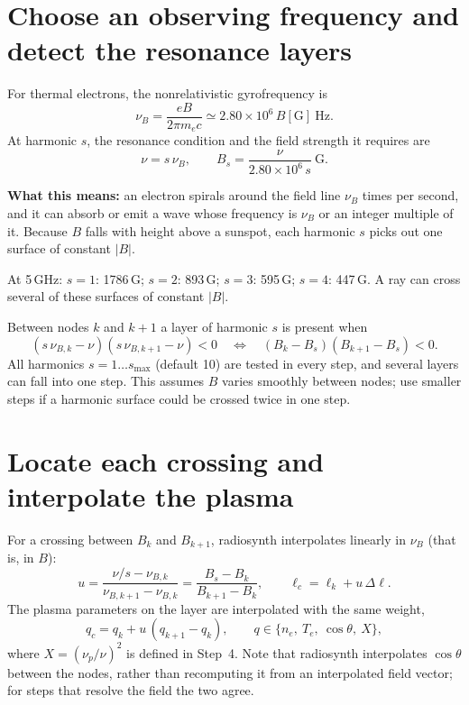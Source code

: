 \documentclass[11pt,a4paper]{article}
\newcommand{\nuB}{\nu_B}
\newcommand{\whatitmeans}[1]{\par{\color{head}\textbf{What this means:}} #1\par}
\begin{document}
\section{Choose an observing frequency and detect the resonance layers}
For thermal electrons, the nonrelativistic gyrofrequency is
\begin{equation}
  \nuB=\frac{eB}{2\pi m_ec}\simeq2.80\times10^6\,B[\text{G}]\ \text{Hz}.
\end{equation}
At harmonic $s$, the resonance condition and the field strength it requires are
\begin{equation}
  \nu=s\,\nuB,\qquad B_s=\frac{\nu}{2.80\times10^6\,s}\ \text{G}.
\end{equation}
\whatitmeans{an electron spirals around the field line $\nuB$ times per second, and it can absorb or emit a
wave whose frequency is $\nuB$ or an integer multiple of it. Because $B$ falls with height above a sunspot,
each harmonic $s$ picks out one surface of constant $|B|$.}
At 5\,GHz: $s=1$: 1786\,G; $s=2$: 893\,G; $s=3$: 595\,G; $s=4$: 447\,G. A ray can cross several
of these surfaces of constant $|B|$.

Between nodes $k$ and $k+1$ a layer of harmonic $s$ is present when
\begin{equation}
  (s\,\nu_{B,k}-\nu)(s\,\nu_{B,k+1}-\nu)<0
  \quad\Longleftrightarrow\quad (B_k-B_s)(B_{k+1}-B_s)<0 .
\end{equation}
All harmonics $s=1\ldots s_\text{max}$ (default 10) are tested in every step, and several layers can
fall into one step. This assumes $B$ varies smoothly between nodes; use smaller steps if a
harmonic surface could be crossed twice in one step.

\section{Locate each crossing and interpolate the plasma}
For a crossing between $B_k$ and $B_{k+1}$, radiosynth interpolates linearly in $\nuB$ (that is, in
$B$):
\begin{equation}
  u=\frac{\nu/s-\nu_{B,k}}{\nu_{B,k+1}-\nu_{B,k}}=\frac{B_s-B_k}{B_{k+1}-B_k},\qquad
  \ell_c=\ell_k+u\,\Delta\ell .
\end{equation}
The plasma parameters on the layer are interpolated with the same weight,
\begin{equation}
  q_c=q_k+u\,(q_{k+1}-q_k),\qquad q\in\{n_e,\ T_e,\ \cos\theta,\ X\},
\end{equation}
where $X=(\nu_p/\nu)^2$ is defined in Step~4. Note that radiosynth interpolates $\cos\theta$ between
the nodes, rather than recomputing it from an interpolated field vector; for steps that resolve
the field the two agree.
\end{document}
